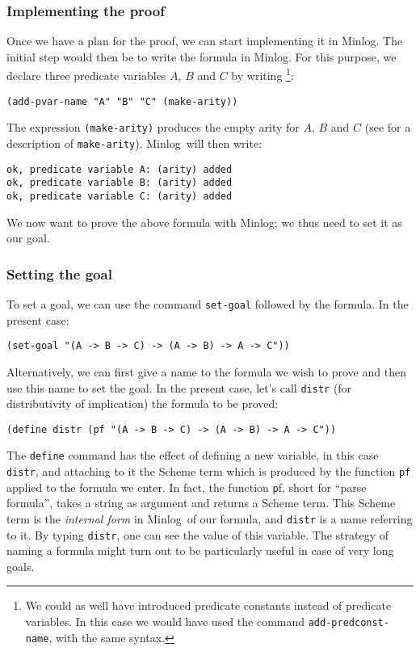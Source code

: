 \documentclass[12pt]{amsart}
\newcommand{\inquotes}[1]{``#1''}
\newcommand{\mi}{Minlog}
\begin{document}
\subsubsection{Implementing the proof}
Once we have a plan for the proof, we can start implementing it in
\mi.  The initial step would then be to write the formula in \mi.  For
this purpose, we declare three predicate variables $A$, $B$ and $C$ by
writing \footnote{We could as well have introduced predicate constants
  instead of predicate variables.  In this case we would have used the
  command \texttt{add-predconst-name}, with the same syntax. }:
\begin{verbatim}
(add-pvar-name "A" "B" "C" (make-arity))
\end{verbatim}
The expression \texttt{(make-arity)} produces the empty arity for $A$,
$B$ and $C$ (see \cite{minlogman} for a description of
\texttt{make-arity}).  \mi\ will then write:
\begin{verbatim}
ok, predicate variable A: (arity) added
ok, predicate variable B: (arity) added
ok, predicate variable C: (arity) added
\end{verbatim}

We now want to prove the above formula with \mi; we thus need to set
it as our goal.


\subsubsection{Setting the goal}
To set a goal, we can use the command \texttt{set-goal} followed by
the formula.  In the present case:
\begin{verbatim}
(set-goal "(A -> B -> C) -> (A -> B) -> A -> C"))
\end{verbatim}
Alternatively, we can first give a name to the formula we wish to
prove and then use this name to set the goal.  In the present case,
let's call \texttt{distr} (for distributivity of implication) the
formula to be proved:
\begin{verbatim}
(define distr (pf "(A -> B -> C) -> (A -> B) -> A -> C"))
\end{verbatim}

The \texttt{define} command has the effect of defining a new variable,
in this case \texttt{distr}, and attaching to it the Scheme term which
is produced by the function \texttt{pf} applied to the formula we
enter.  In fact, the function {\texttt pf}, short for \inquotes{parse
  formula}, takes a string as argument and returns a Scheme term.
This Scheme term is the \emph{internal form} in \mi\ of our formula,
and \texttt{distr} is a name referring to it.  By typing
\texttt{distr}, one can see the value of this variable.  The strategy
of naming a formula might turn out to be particularly useful in case
of very long goals.
\end{document}
